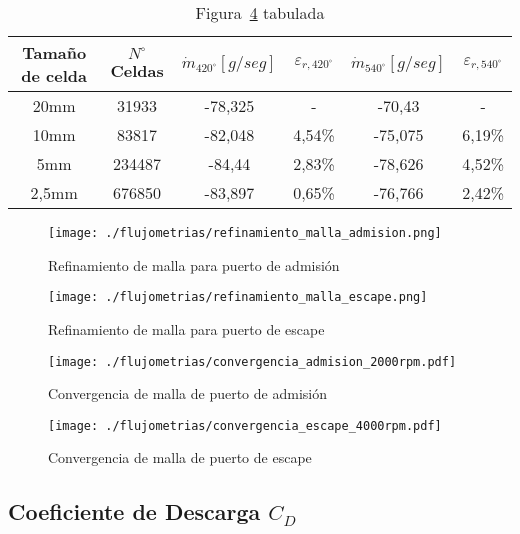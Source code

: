 \begin{table}
  \centering
  \begin{tabular}{cccccc}\toprule
    Tamaño de celda & $N^{\circ}$ Celdas & $\dot{m}_{420^{\circ}} [g/seg]$ & $\varepsilon_{r,420^{\circ}}$ & $\dot{m}_{540^{\circ}} [g/seg]$ & $\varepsilon_{r,540^{\circ}}$ \\ \midrule
    20mm  & 31933  & -78,325 & - & -70,43 & - \\
    10mm  & 83817  & -82,048 & 4,54\% & -75,075 & 6,19\% \\
    5mm   & 234487 & -84,44  & 2,83\% & -78,626 & 4,52\% \\
    2,5mm & 676850 & -83,897 & 0,65\% & -76,766 & 2,42\% \\ \bottomrule
  \end{tabular}
  \caption{Figura~\ref{fig:conv_malla_escape} tabulada}\label{tab:convergencia_malla_escape}
\end{table}

\begin{figure}[ht]
  \centering
  \texttt{[image: ./flujometrias/refinamiento\_malla\_admision.png]}
  \caption{Refinamiento de malla para puerto de admisión}\label{fig:refinamiento_admision}
\end{figure}

\begin{figure}[ht]
  \centering
  \texttt{[image: ./flujometrias/refinamiento\_malla\_escape.png]}
  \caption{Refinamiento de malla para puerto de escape}\label{fig:refinamiento_escape}
\end{figure}

\begin{figure}[ht]
  \centering
  \texttt{[image: ./flujometrias/convergencia\_admision\_2000rpm.pdf]}
  \caption{Convergencia de malla de puerto de admisión}\label{fig:conv_malla_admision}
\end{figure}

\begin{figure}[ht]
  \centering
  \texttt{[image: ./flujometrias/convergencia\_escape\_4000rpm.pdf]}
  \caption{Convergencia de malla de puerto de escape}\label{fig:conv_malla_escape}
\end{figure}


\subsection{Coeficiente de Descarga $C_{D}$}\label{sec:cap2_cd}

